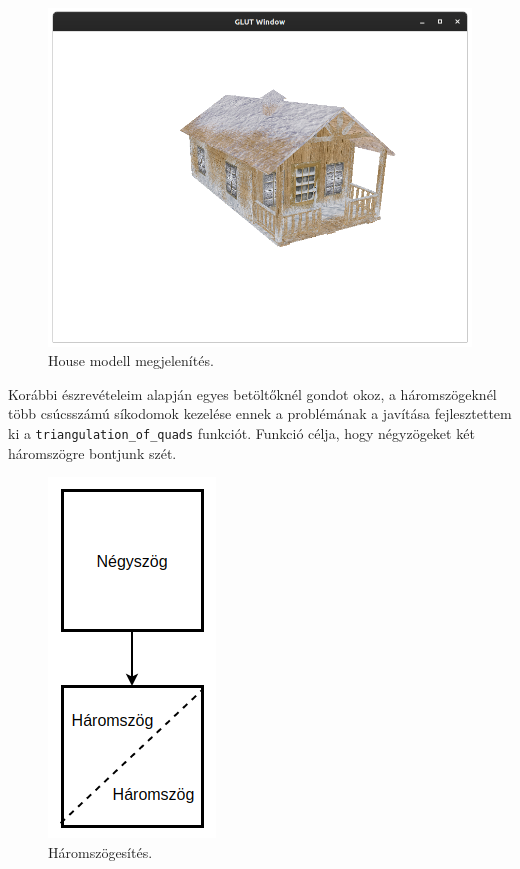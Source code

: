 \begin{figure}[h]
\centering
\includegraphics[width=\textwidth]{images/demo.png}
\caption{House modell megjelenítés.}
\label{fig:demo}
\end{figure}
\newpage
{}
Korábbi észrevételeim alapján egyes betöltőknél gondot okoz, a háromszögeknél több csúcsszámú síkodomok kezelése ennek a problémának a javítása fejlesztettem ki a \texttt{triangulation\_of\_quads} funkciót. Funkció célja, hogy négyzögeket két háromszögre bontjunk szét.
\begin{figure}[h]
\centering
\includegraphics[scale=0.39]{images/triangulation.png}
\caption{Háromszögesítés.}
\label{fig:tri}
\end{figure}

